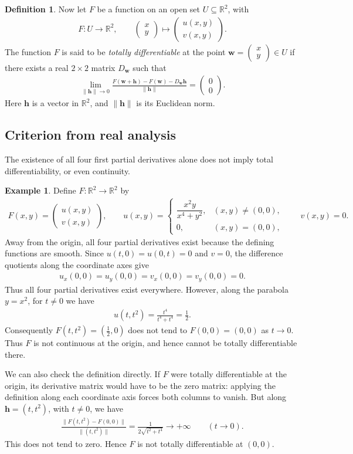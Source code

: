 \documentclass[11pt]{article}
\theoremstyle{plain}
\theoremstyle{definition}
\newtheorem{definition}[theorem]{Definition}
\newtheorem{example}[theorem]{Example}
\theoremstyle{remark}
\numberwithin{equation}{section}
\newcommand{\be}{\begin{eqnarray}}
\newcommand{\ee}{\end{eqnarray}}
\newcommand{\R}{\mathbb{R}}
\newcommand{\ww}{\mathbf w}
\newcommand{\hh}{\mathbf h}
\begin{document}
\begin{definition}
Now let $F$ be a function on an open set $U\subseteq\R^2$, with
\be
 F:U\to\R^2,\qquad
 \begin{pmatrix}x\\y\end{pmatrix}\longmapsto
 \begin{pmatrix}u(x,y)\\v(x,y)\end{pmatrix}.
\ee
The function $F$ is said to be \emph{totally differentiable} at the point
$\ww=\begin{pmatrix}x\\y\end{pmatrix}\in U$ if there exists a real $2\times2$ matrix
$D_{\ww}$ such that
\be
 \lim_{\|\hh\|\to0}
 \frac{F(\ww+\hh)-F(\ww)-D_{\ww}\hh}{\|\hh\|}
 =\begin{pmatrix}0\\0\end{pmatrix}.
\ee
Here $\hh$ is a vector in $\R^2$, and $\|\hh\|$ is its Euclidean norm.
\end{definition}

\subsection*{Criterion from real analysis}
The existence of all four first partial derivatives alone does not imply
total differentiability, or even continuity.
\begin{example}
Define $F:\R^2\to\R^2$ by
\be
 F(x,y)=\begin{pmatrix}u(x,y)\\v(x,y)\end{pmatrix},\qquad
 u(x,y)=
 \begin{cases}
 \dfrac{x^2y}{x^4+y^2},&(x,y)\ne(0,0),\\[0.5em]
 0,&(x,y)=(0,0),
 \end{cases}
 \qquad v(x,y)=0.
\ee
Away from the origin, all four partial derivatives exist because the
defining functions are smooth. Since $u(t,0)=u(0,t)=0$ and $v=0$,
the difference quotients along the coordinate axes give
\be
 u_x(0,0)=u_y(0,0)=v_x(0,0)=v_y(0,0)=0.
\ee
Thus all four partial derivatives exist everywhere. However, along the
parabola $y=x^2$, for $t\ne0$ we have
\be
 u(t,t^2)=\frac{t^4}{t^4+t^4}=\frac12.
\ee
Consequently $F(t,t^2)=(\tfrac12,0)$ does not tend to $F(0,0)=(0,0)$
as $t\to0$. Thus $F$ is not continuous at the origin, and hence cannot
be totally differentiable there.

We can also check the definition directly. If $F$ were totally
differentiable at the origin, its derivative matrix
would have to be the zero matrix: applying the definition along each
coordinate axis forces both columns to vanish. But along
$\hh=(t,t^2)$, with $t\ne0$, we have
\be
 \frac{\|F(t,t^2)-F(0,0)\|}{\|(t,t^2)\|}
 =\frac{1}{2\sqrt{t^2+t^4}}
 \longrightarrow+\infty\qquad(t\to0).
\ee
This does not tend to zero. Hence $F$ is not totally differentiable at
$(0,0)$.
\end{example}
\end{document}
